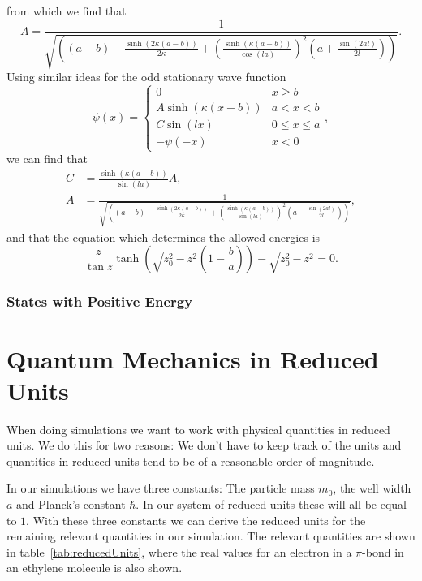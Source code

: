 \documentclass[12pt,a4paper]{article}
\begin{document}
from which we find that
\begin{equation}
A = \frac{1}{\sqrt{\left( (a - b) - \frac{\sinh \left( 2 \kappa (a - b) \right)}{2 \kappa}  + \left( \frac{\sinh \left(\kappa (a - b) \right)}{\cos (la)} \right)^2 \left(a + \frac{\sin(2 a l)}{2 l} \right) \right)}}.
\end{equation}
Using similar ideas for the odd stationary wave function
\begin{equation}
\psi(x) = \begin{cases} 0 & x \geq b \\
                        A \sinh \left(\kappa (x - b) \right) & a < x < b \\
                        C \sin (l x) & 0 \leq x \leq a \\
                        -\psi(-x) & x < 0
\end{cases},
\end{equation}
we can find that
\begin{align}
C &= \frac{\sinh \left( \kappa (a - b) \right)}{\sin (l a)} A, \\
A &= \frac{1}{\sqrt{\left( (a - b) - \frac{\sinh \left( 2 \kappa (a - b) \right)}{2 \kappa}  + \left( \frac{\sinh \left(\kappa (a - b) \right)}{\sin (la)} \right)^2 \left(a - \frac{\sin(2 a l)}{2 l} \right) \right)}},
\end{align}
and that the equation which determines the allowed energies is
\begin{equation}
\frac{z}{\tan z} \tanh \left( \sqrt{z_0^2 - z^2} \left( 1 - \frac{b}{a} \right) \right) - \sqrt{z_0^2 - z^2} = 0. \label{eq:negOddEnergies}
\end{equation}

\subsubsection{States with Positive Energy}


\section{Quantum Mechanics in Reduced Units}
When doing simulations we want to work with physical quantities in reduced units. We do this for two reasons: We don't have to keep track of the units and quantities in reduced units tend to be of a reasonable order of magnitude.

In our simulations we have three constants: The particle mass $m_0$, the well width $a$ and Planck's constant $\hbar$. In our system of reduced units these will all be equal to $1$. With these three constants we can derive the reduced units for the remaining relevant quantities in our simulation. The relevant quantities are shown in table~\ref{tab:reducedUnits}, where the real values for an electron in a $\pi$-bond in an ethylene molecule is also shown.
\end{document}
